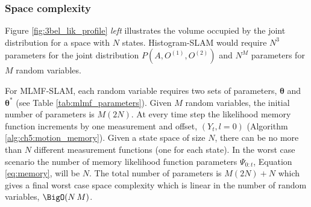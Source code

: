 \subsubsection{Space complexity}

Figure \ref{fig:3bel_lik_profile} \textit{left} illustrates the volume occupied by the joint distribution
for a space with $N$ states. Histogram-SLAM would require $N^3$ parameters for the joint distribution $P(A,O^{(1)},O^{(2)})$ and $N^{M}$ parameters for $M$ random variables. 

For MLMF-SLAM, each random variable requires two sets of parameters, $\boldsymbol{\theta}$ and $\boldsymbol{\theta}^*$ 
(see Table \ref{tab:mlmf_parameters}). Given
$M$ random variables, the initial number of parameters is $M (2 N)$.
At every time step the likelihood memory function increments by one measurement and offset, $(Y_t,l=0)$ (Algorithm \ref{alg:ch5:motion_memory}).
Given a state space of size $N$, there can be no more than $N$ different measurement functions (one for each state). In
the worst case scenario the number of memory likelihood function parameters $\Psi_{0:t}$, Equation \ref{eq:memory}, will be $N$.
The total number of parameters is $M (2 N) + N$ which gives a final worst case space complexity which is linear in the number of 
random variables, $\BigO(N\,M)$. 

